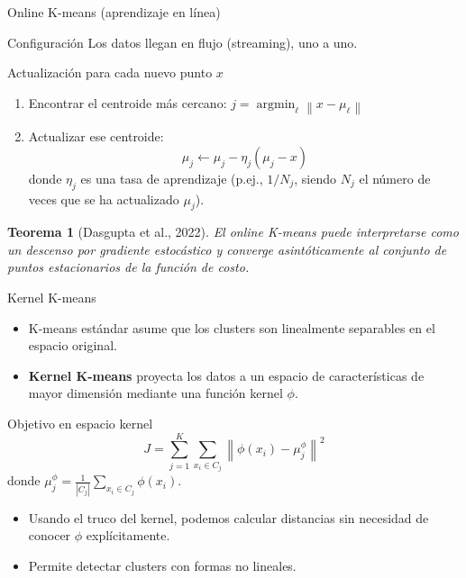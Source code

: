\documentclass[aspectratio=169]{beamer}
\newtheorem{teorema}{Teorema}
\newcommand{\norm}[1]{\left\lVert #1 \right\rVert}
\newcommand{\argmin}{\operatorname{argmin}}
\begin{document}
\begin{frame}{Online K-means (aprendizaje en línea)}
    \begin{block}{Configuración}
        Los datos llegan en flujo (streaming), uno a uno.
    \end{block}
    
    \begin{block}{Actualización para cada nuevo punto \(x\)}
        \begin{enumerate}
            \item Encontrar el centroide más cercano: \(j = \argmin_\ell \norm{x - \mu_\ell}\)
            \item Actualizar ese centroide:
            \[
            \mu_j \leftarrow \mu_j - \eta_j (\mu_j - x)
            \]
            donde \(\eta_j\) es una tasa de aprendizaje (p.ej., \(1/N_j\), siendo \(N_j\) el número de veces que se ha actualizado \(\mu_j\)).
        \end{enumerate}
    \end{block}
    
    \begin{teorema}[Dasgupta et al., 2022]
        El online K-means puede interpretarse como un descenso por gradiente estocástico y converge asintóticamente al conjunto de puntos estacionarios de la función de costo.
    \end{teorema}
\end{frame}

\begin{frame}{Kernel K-means}
    \begin{itemize}
        \item K-means estándar asume que los clusters son linealmente separables en el espacio original.
        \item \textbf{Kernel K-means} proyecta los datos a un espacio de características de mayor dimensión mediante una función kernel \(\phi\).
    \end{itemize}
    
    \begin{block}{Objetivo en espacio kernel}
        \[
        J = \sum_{j=1}^K \sum_{x_i \in C_j} \norm{\phi(x_i) - \mu_j^\phi}^2
        \]
        donde \(\mu_j^\phi = \frac{1}{|C_j|} \sum_{x_i \in C_j} \phi(x_i)\).
    \end{block}
    
    \begin{itemize}
        \item Usando el truco del kernel, podemos calcular distancias sin necesidad de conocer \(\phi\) explícitamente.
        \item Permite detectar clusters con formas no lineales.
    \end{itemize}
\end{frame}
\end{document}

